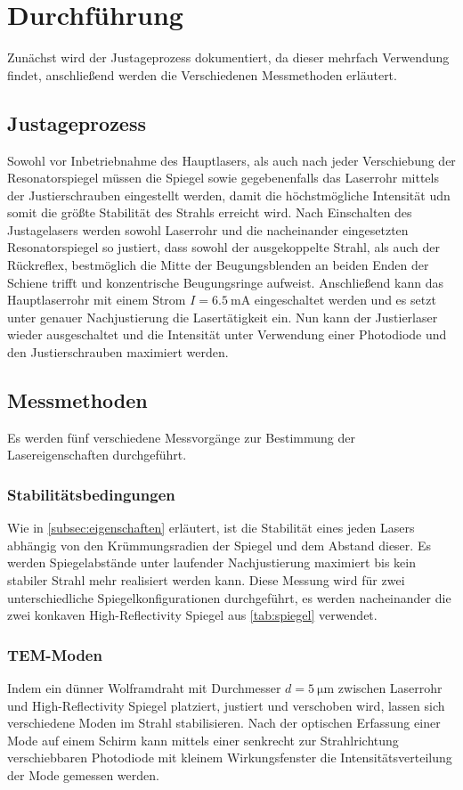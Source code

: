\section{Durchführung}\label{sec:durchfuehrung}
Zunächst wird der Justageprozess dokumentiert, da dieser mehrfach Verwendung findet, anschließend werden die Verschiedenen Messmethoden erläutert.
\subsection{Justageprozess}
Sowohl vor Inbetriebnahme des Hauptlasers, als auch nach jeder Verschiebung der Resonatorspiegel müssen die Spiegel sowie gegebenenfalls das Laserrohr mittels der Justierschrauben eingestellt werden, damit die höchstmögliche Intensität udn somit die größte Stabilität des Strahls erreicht wird.
Nach Einschalten des Justagelasers werden sowohl Laserrohr und die nacheinander eingesetzten Resonatorspiegel so justiert, dass sowohl der ausgekoppelte Strahl, als auch der Rückreflex, bestmöglich die Mitte der Beugungsblenden an beiden Enden der Schiene trifft und konzentrische Beugungsringe aufweist.
Anschließend kann das Hauptlaserrohr mit einem Strom $I=\SI{6.5}{\milli\ampere}$ eingeschaltet werden und es setzt unter genauer Nachjustierung die Lasertätigkeit ein. Nun kann der Justierlaser wieder ausgeschaltet und die Intensität unter Verwendung einer Photodiode und den Justierschrauben maximiert werden.
\subsection{Messmethoden}
Es werden fünf verschiedene Messvorgänge zur Bestimmung der Lasereigenschaften durchgeführt.
\subsubsection{Stabilitätsbedingungen}
Wie in \autoref{subsec:eigenschaften} erläutert, ist die Stabilität eines jeden Lasers abhängig von den Krümmungsradien der Spiegel und dem Abstand dieser. Es werden Spiegelabstände unter laufender Nachjustierung maximiert bis kein stabiler Strahl mehr realisiert werden kann. Diese Messung wird für zwei unterschiedliche Spiegelkonfigurationen durchgeführt, es werden nacheinander die zwei konkaven High-Reflectivity Spiegel aus \autoref{tab:spiegel} verwendet.
\subsubsection{TEM-Moden}
Indem ein dünner Wolframdraht mit Durchmesser $d=\SI{5}{\micro\meter}$ zwischen Laserrohr und High-Reflectivity Spiegel platziert, justiert und verschoben wird, lassen sich verschiedene Moden im Strahl stabilisieren. Nach der optischen Erfassung einer Mode auf einem Schirm kann mittels einer senkrecht zur Strahlrichtung verschiebbaren Photodiode mit kleinem Wirkungsfenster die Intensitätsverteilung der Mode gemessen werden.

